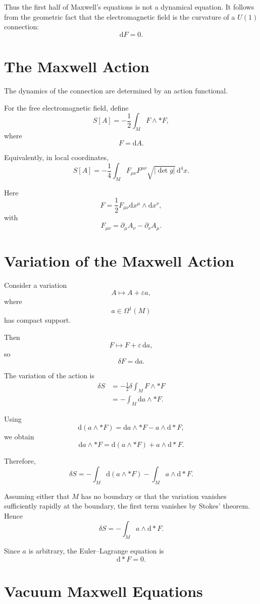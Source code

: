\documentclass[11pt,a4paper]{article}
\newcommand{\dd}{\mathrm{d}}
\begin{document}
Thus the first half of Maxwell's equations is not a dynamical
equation. It follows from the geometric fact that the electromagnetic
field is the curvature of a $U(1)$ connection:
\[
\boxed{\dd F=0.}
\]

\section{The Maxwell Action}

The dynamics of the connection are determined by an action
functional.

For the free electromagnetic field, define
\[
S[A]
=
-\frac12
\int_M
F\wedge *F,
\]
where
\[
F=\dd A.
\]

Equivalently, in local coordinates,
\[
S[A]
=
-\frac14
\int_M
F_{\mu\nu}F^{\mu\nu}
\sqrt{|\det g|}\,
\dd^4x.
\]

Here
\[
F
=
\frac12
F_{\mu\nu}
\dd x^\mu\wedge\dd x^\nu,
\]
with
\[
F_{\mu\nu}
=
\partial_\mu A_\nu
-
\partial_\nu A_\mu.
\]

\section{Variation of the Maxwell Action}

Consider a variation
\[
A\longmapsto A+\varepsilon a,
\]
where
\[
a\in\Omega^1(M)
\]
has compact support.

Then
\[
F
\longmapsto
F+\varepsilon\,\dd a,
\]
so
\[
\delta F=\dd a.
\]

The variation of the action is
\begin{align*}
\delta S
&=
-\frac12
\delta
\int_M F\wedge *F
\\
&=
-\int_M
\dd a\wedge *F.
\end{align*}

Using
\[
\dd(a\wedge *F)
=
\dd a\wedge *F
-
a\wedge\dd *F,
\]
we obtain
\[
\dd a\wedge *F
=
\dd(a\wedge *F)
+
a\wedge\dd *F.
\]

Therefore,
\[
\delta S
=
-\int_M\dd(a\wedge *F)
-
\int_M a\wedge\dd *F.
\]

Assuming either that $M$ has no boundary or that the variation
vanishes sufficiently rapidly at the boundary, the first term
vanishes by Stokes' theorem. Hence
\[
\delta S
=
-\int_M
a\wedge\dd *F.
\]

Since $a$ is arbitrary, the Euler--Lagrange equation is
\[
\boxed{\dd *F=0.}
\]

\section{Vacuum Maxwell Equations}
\end{document}
